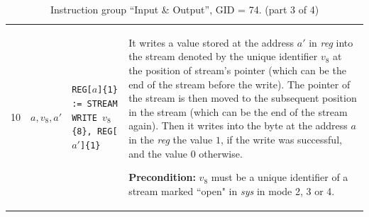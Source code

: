 \documentclass[10pt,twocolumn]{article}
\begin{document}
\begin{table}[!h]
\begin{center}
\begin{tabular}{lp{1.2cm}p{5.5cm}p{7.5cm}}
10 & $ a,v_8,a' $ %
& \texttt{REG[}$ a $\texttt{]\{1\} := STREAM WRITE }$ v_8 $\texttt{\{8\}, REG[}$
a' $\texttt{]\{1\}} %
& It writes a value stored at the address $ a' $ in \textit{reg} into the stream
denoted by the unique identifier $ v_8 $ at the position of stream's pointer
(which can be the end of the stream before the write). The pointer of the stream
is then moved to the subsequent position in the stream (which can be the end of
the stream again). Then it writes into the byte at the address $ a $ in the
\textit{reg} the value $ 1 $, if the write was successful, and the value $ 0 $
otherwise.

\textbf{Precondition:} $ v_8 $ must be a unique identifier of a stream marked
``open" in \textit{sys} in mode 2, 3 or 4. \\

\end{tabular}
\end{center}
\caption{Instruction group ``Input \& Output'', GID = 74. (part 3 of 4)}
\end{table}
\end{document}
